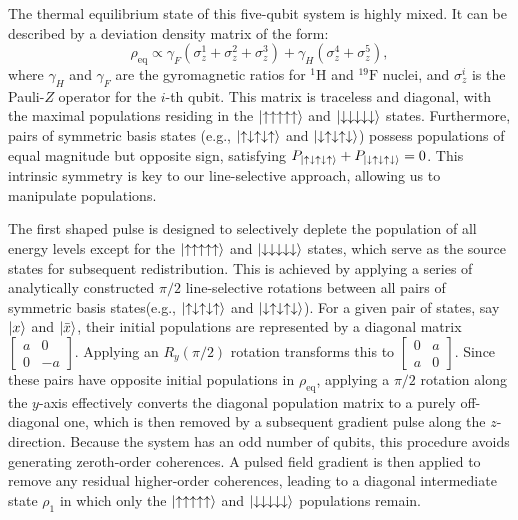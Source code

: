 \documentclass[aps,pra,twocolumn,superscriptaddress,preprintnumbers,amsmath,amssymb]{revtex4-2}
\begin{document}
The thermal equilibrium state of this five-qubit system is highly mixed. It can be described by a deviation density matrix of the form:
\begin{equation}
\rho_{\mathrm{eq}} \propto \gamma_F(\sigma_z^1 + \sigma_z^2 + \sigma_z^3) + \gamma_H(\sigma_z^4 + \sigma_z^5),
\end{equation}
where $\gamma_H$ and $\gamma_F$ are the gyromagnetic ratios for $^{1}\mathrm{H}$ and $^{19}\mathrm{F}$ nuclei, and $\sigma_z^i$ is the Pauli-$Z$ operator for the $i$-th qubit. This matrix is traceless and diagonal, with the maximal populations residing in the $\ket{\uparrow\uparrow\uparrow\uparrow\uparrow}$ and $\ket{\downarrow\downarrow\downarrow\downarrow\downarrow}$ states. Furthermore, pairs of symmetric basis states (e.g., $\ket{\uparrow\downarrow\uparrow\downarrow\uparrow}$ and $\ket{\downarrow\uparrow\downarrow\uparrow\downarrow}$) possess populations of equal magnitude but opposite sign, satisfying $P_{\ket{\uparrow\downarrow\uparrow\downarrow\uparrow}} + P_{\ket{\downarrow\uparrow\downarrow\uparrow\downarrow}} = 0$. This intrinsic symmetry is key to our line-selective approach, allowing us to manipulate populations.

The first shaped pulse is designed to selectively deplete the population of all energy levels except for the $\ket{\uparrow\uparrow\uparrow\uparrow\uparrow}$ and $\ket{\downarrow\downarrow\downarrow\downarrow\downarrow}$ states, which serve as the source states for subsequent redistribution. This is achieved by applying a series of analytically constructed $\pi/2$ line-selective rotations between all pairs of symmetric basis states(e.g., $\ket{\uparrow\downarrow\uparrow\downarrow\uparrow}$ and $\ket{\downarrow\uparrow\downarrow\uparrow\downarrow}$). For a given pair of states, say $\ket{x}$ and $\ket{\Bar{x}}$, their initial populations are represented by a diagonal matrix $\begin{bmatrix} a & 0 \\ 0 & -a \end{bmatrix}$. Applying an $R_y(\pi/2)$ rotation transforms this to $\begin{bmatrix} 0 & a \\ a & 0 \end{bmatrix}$. Since these pairs have opposite initial populations in $\rho_{\mathrm{eq}}$, applying a $\pi/2$ rotation along the $y$-axis effectively converts the diagonal population matrix to a purely off-diagonal one, which is then removed by a subsequent gradient pulse along the $z$-direction.
Because the system has an odd number of qubits, this procedure avoids generating zeroth-order coherences. A pulsed field gradient is then applied to remove any residual higher-order coherences, leading to a diagonal intermediate state $\rho_1$ in which only the $\ket{\uparrow\uparrow\uparrow\uparrow\uparrow}$ and $\ket{\downarrow\downarrow\downarrow\downarrow\downarrow}$ populations remain.
\end{document}
